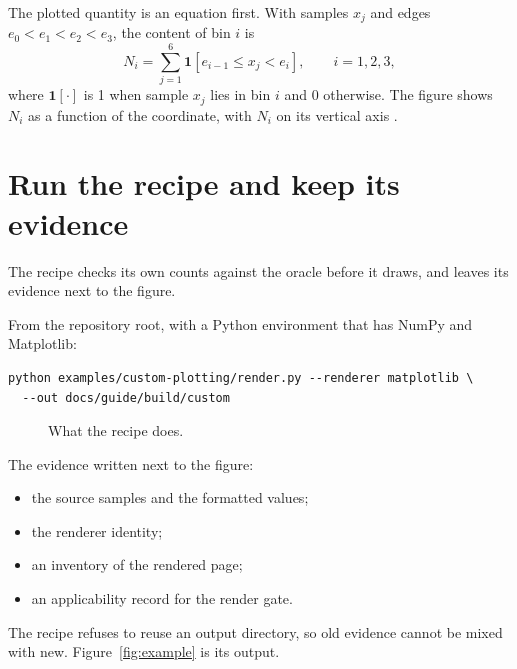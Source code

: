 The plotted quantity is an equation first. With samples $x_j$ and edges
$e_0<e_1<e_2<e_3$, the content of bin $i$ is
\begin{equation}
  N_i = \sum_{j=1}^{6} \mathbf{1}\!\left[e_{i-1}\le x_j<e_i\right],
  \qquad i=1,2,3,
  \label{eq:counts}
\end{equation}
where $\mathbf{1}[\cdot]$ is 1 when sample $x_j$ lies in bin $i$ and 0 otherwise. The figure
shows $N_i$ as a function of the coordinate, with $N_i$ on its vertical axis \cite[Design
  and iterate at two scales]{skill:plot-production}.

\section{Run the recipe and keep its evidence}

\begin{headline}
  The recipe checks its own counts against the oracle before it draws, and leaves its
  evidence next to the figure.
\end{headline}

From the repository root, with a Python environment that has NumPy and Matplotlib:
\begin{lstlisting}
python examples/custom-plotting/render.py --renderer matplotlib \
  --out docs/guide/build/custom
\end{lstlisting}

\begin{figure}[H]
  \centering
  \caption{What the recipe does.}
  \label{fig:example-recipe}
\end{figure}

The evidence written next to the figure:
\begin{itemize}
  \item the source samples and the formatted values;
  \item the renderer identity;
  \item an inventory of the rendered page;
  \item an applicability record for the render gate.
\end{itemize}
The recipe refuses to reuse an output directory, so old evidence cannot be mixed with new.
Figure~\ref{fig:example} is its output.

